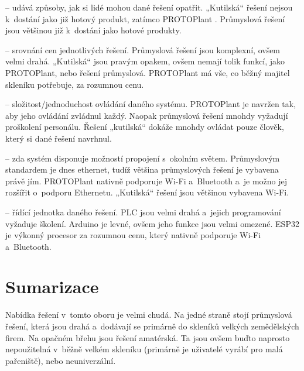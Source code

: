 \noindent{} -- udává způsoby, jak si lidé mohou dané řešení opatřit.
„Kutilská“ řešení nejsou k~dostání jako již hotový produkt, zatímco PROTO\-Plant . \newline
Průmyslová řešení jsou většinou již k~dostání jako hotové produkty.

\noindent{} -- srovnání cen jednotlivých řešení.
Průmyslová řešení jsou komplexní, ovšem velmi drahá.
„Kutilská“ jsou pravým opakem, ovšem nemají tolik funkcí, jako PROTOPlant, nebo řešení průmyslová.
PROTOPlant má vše, co běžný majitel skleníku potřebuje, za rozumnou cenu. \newline

\noindent{} -- složitost/jednoduchost ovládání daného systému.
PROTOPlant je navržen tak, aby jeho ovládání zvládnul každý.
Naopak průmyslová řešení mnohdy vyžadují proškolení personálu.
Řešení „kutilská“ dokáže mnohdy ovládat pouze člověk, který si dané řešení navrhnul. \newline

\noindent{} -- zda systém disponuje možností propojení s~okolním světem.
Průmyslovým standardem je dnes ethernet, tudíž většina průmyslových řešení je vybavena právě jím.
PROTOPlant nativně podporuje Wi-Fi a~Bluetooth a~je možno jej rozšířit o~podporu Ethernetu.
„Kutilská“ řešení jsou většinou vybavena Wi-Fi. \newline

\noindent{} -- řídící jednotka daného řešení.
PLC jsou velmi drahá a~jejich programování vyžaduje školení.
Arduino je levné, ovšem jeho funkce jsou velmi omezené.
ESP32 je výkonný procesor za rozumnou cenu, který nativně podporuje Wi-Fi a~Bluetooth. \newline

\section{Sumarizace}
Nabídka řešení v~tomto oboru je velmi chudá.
Na jedné straně stojí průmyslová řešení, která jsou drahá a~dodávají se primárně do skleníků velkých zemědělských firem.
Na opačném břehu jsou řešení amatérská. 
Ta jsou ovšem buďto naprosto nepoužitelná v~běžně velkém skleníku (primárně je uživatelé vyrábí pro malá pařeniště), nebo neuniverzální.

\newpage